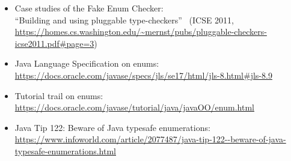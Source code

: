 
\begin{itemize}
\item Case studies of the Fake Enum Checker:\\
  ``Building and using pluggable type-checkers''~\cite{DietlDEMS2011}
  (ICSE 2011, \url{https://homes.cs.washington.edu/~mernst/pubs/pluggable-checkers-icse2011.pdf#page=3})

\item Java Language Specification on enums:\\
  \url{https://docs.oracle.com/javase/specs/jls/se17/html/jls-8.html#jls-8.9}

\item Tutorial trail on enums:\\
  \url{https://docs.oracle.com/javase/tutorial/java/javaOO/enum.html}

\item Java Tip 122: Beware of Java typesafe enumerations:\\
  \url{https://www.infoworld.com/article/2077487/java-tip-122--beware-of-java-typesafe-enumerations.html}

\end{itemize}

